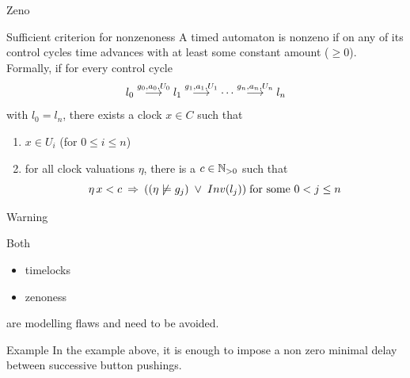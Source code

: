 \documentclass{beamer}
\def\dkb#1{{\blue #1}}
\begin{document}
\begin{slide}{Zeno}
\small


\begin{block}{Sufficient criterion for nonzenoness}
A timed automaton is nonzeno if on any of its control cycles time advances with at least some  
\dkb{constant amount} ($\geq 0$). Formally, if for every control cycle
\begin{equation*}
l_0 \stackrel{g_0, a_0, U_0}{\longrightarrow} l_1 \stackrel{g_1, a_1, U_1}{\longrightarrow} \cdots  \stackrel{g_n, a_n, U_n}{\longrightarrow} l_n 
\end{equation*}
with $l_0=l_n$,  there exists a clock $x \in C$ such that
\begin{enumerate}
\item  $x \in U_i$ (for $0 \leq i \leq n$)
\item for all clock valuations $\eta$, there is a  $c \in \mathbb{N}_{>0}$ such that
\begin{equation*}
\eta\, x < c\; \mathbin{\Rightarrow}\; ((\eta \not\models g_j)\; \mathbin{\vee}\; Inv(l_j)) \; \text{for some $0 < j \leq n$}
\end{equation*}
\end{enumerate}


\end{block}

\end{slide}


\begin{slide}{Warning}
\small

Both 
\begin{itemize}
\item timelocks
\item zenoness
\end{itemize}
are \dkb{modelling flaws} and need to be avoided.


\begin{block}{Example}
In the example above, it is enough to impose a non zero minimal delay  between successive button pushings.
\end{block}

\end{slide}
\end{document}
